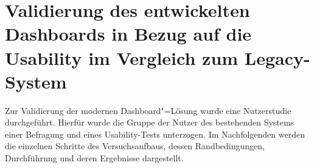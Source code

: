 \chapter{Validierung des entwickelten Dashboards in Bezug auf die Usability im Vergleich zum Legacy-System}
\label{ch:Ergebnisse}
Zur Validierung der modernen Dash\-board"=Lösung wurde eine Nutzerstudie durchgeführt. Hierfür wurde die Gruppe der Nutzer des bestehenden Systems einer Befragung und eines Usability-Tests unterzogen. Im Nachfolgenden werden die einzelnen Schritte des Versuchsaufbaus, dessen Randbedingungen, Durchführung und deren Ergebnisse dargestellt.\\


